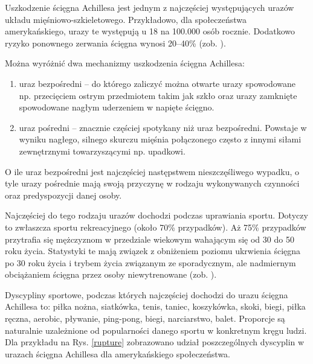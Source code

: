 Uszkodzenie ścięgna Achillesa jest jednym z najczęściej występujących urazów układu mięśniowo-szkieletowego. Przykładowo, dla społeczeństwa amerykańskiego, urazy te występują u 18 na 100.000 osób rocznie. Dodatkowo ryzyko ponownego zerwania ścięgna wynosi 20--40\% (zob. \cite{EpidemiologyUS}). 

Można wyróżnić dwa mechanizmy uszkodzenia ścięgna Achillesa: 
\begin{enumerate}
	\item uraz bezpośredni -- do którego zaliczyć można otwarte urazy spowodowane np. przecięciem ostrym przedmiotem takim jak szkło oraz urazy zamknięte spowodowane nagłym uderzeniem w napięte ścięgno.
	\item uraz pośredni -- znacznie częściej spotykany niż uraz bezpośredni. Powstaje w wyniku nagłego, silnego skurczu mięśnia połączonego często z innymi siłami zewnętrznymi towarzyszącymi np. upadkowi.
\end{enumerate}
O ile uraz bezpośredni jest najczęściej następstwem nieszczęśliwego wypadku, o tyle urazy pośrednie mają swoją przyczynę w rodzaju wykonywanych czynności oraz predyspozycji danej osoby. 

Najczęściej do tego rodzaju urazów dochodzi podczas uprawiania sportu. Dotyczy to zwłaszcza sportu rekreacyjnego (około 70\% przypadków). Aż 75\% przypadków przytrafia się mężczyznom w przedziale wiekowym wahającym się od 30 do 50 roku życia. Statystyki te mają związek z obniżeniem poziomu ukrwienia ścięgna po 30 roku życia i trybem życia związanym ze sporadycznym, ale nadmiernym obciążaniem ścięgna przez osoby niewytrenowane (zob. \cite{Etiologia}). 

Dyscypliny sportowe, podczas których najczęściej dochodzi do urazu ścięgna Achillesa to: piłka nożna, siatkówka, tenis, taniec, koszykówka, skoki, biegi, piłka ręczna, aerobic, pływanie, ping-pong, biegi, narciarstwo, balet. Proporcje są naturalnie uzależnione od popularności danego sportu w konkretnym kręgu ludzi. Dla przykładu na Rys. \ref{rupture} zobrazowano udział poszczególnych dyscyplin w urazach ścięgna Achillesa dla amerykańskiego społeczeństwa. 

